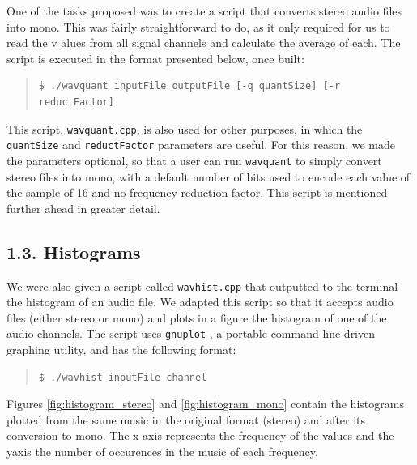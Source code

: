 \documentclass[12pt]{article}
\begin{document}
One of the tasks proposed was to create a script that converts stereo audio 
files into mono.
This was fairly straightforward to do, as it only required for us to read the v
alues from all signal channels and calculate the average of each.
The script is executed in the format presented below, once built:

\begingroup
\addtolength\leftmargini{-0.4in}
\begin{quote}
\begin{verbatim}
$ ./wavquant inputFile outputFile [-q quantSize] [-r reductFactor]
\end{verbatim}
\end{quote}
\endgroup

This script, \texttt{wavquant.cpp}, is also used for other purposes, in which 
the \texttt{quantSize} and \texttt{reductFactor} parameters are useful.
For this reason, we made the parameters optional, so that a user can run 
\texttt{wavquant} to simply convert stereo files into mono, with a default 
number of bits used to encode each value of the sample of 16 and no frequency
reduction factor.
This script is mentioned further ahead in greater detail.

\subsection*{1.3. Histograms}

We were also given a script called \texttt{wavhist.cpp} that outputted to the 
terminal the histogram of an audio file.
We adapted this script so that it accepts audio files (either stereo or mono) 
and plots in a figure the histogram of one of the audio channels.
The script uses \texttt{gnuplot} \cite{gnuplot}, a portable command-line driven 
graphing utility, and has the following format:

\begingroup
\addtolength\leftmargini{-0.4in}
\begin{quote}
\begin{verbatim}
$ ./wavhist inputFile channel
\end{verbatim}
\end{quote}
\endgroup

Figures \ref{fig:histogram_stereo} and \ref{fig:histogram_mono} contain the 
histograms plotted from the same music in the original format (stereo) and after 
its conversion to mono. 
The x axis represents the frequency of the values and the yaxis the number of 
occurences in the music of each frequency.
\end{document}
